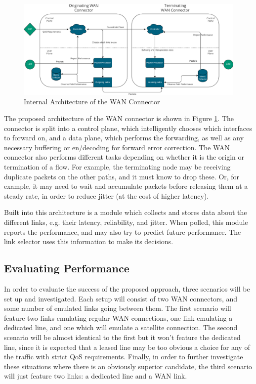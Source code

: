 \begin{figure}[h]
    \centering
        \includegraphics[width=\textwidth]{fig/be-architecture.png}
        \caption{Internal Architecture of the WAN Connector}
        \label{fig:arch}
\end{figure}

The proposed architecture of the WAN connector is shown in Figure \ref{fig:arch}. The connector is split into a control plane, which intelligently chooses which interfaces to forward on, and a data plane, which performs the forwarding, as well as any necessary buffering or en/decoding for forward error correction. The WAN connector also performs different tasks depending on whether it is the origin or termination of a flow. For example, the terminating node may be receiving duplicate packets on the other paths, and it must know to drop these. Or, for example, it may need to wait and accumulate packets before releasing them at a steady rate, in order to reduce jitter (at the cost of higher latency).

Built into this architecture is a module which collects and stores data about the different links, e.g. their latency, reliability, and jitter. When polled, this module reports the performance, and may also try to predict future performance. The link selector uses this information to make its decisions.

\subsection{Evaluating Performance}

In order to evaluate the success of the proposed approach, three scenarios will be set up and investigated. Each setup will consist of two WAN connectors, and some number of emulated links going between them. The first scenario will feature two links emulating regular WAN connections, one link emulating a dedicated line, and one which will emulate a satellite connection. The second scenario will be almost identical to the first but it won't feature the dedicated line, since it is expected that a leased line may be too obvious a choice for any of the traffic with strict QoS requirements. Finally, in order to further investigate these situations where there is an obviously superior candidate, the third scenario will just feature two links: a dedicated line and a WAN link.

